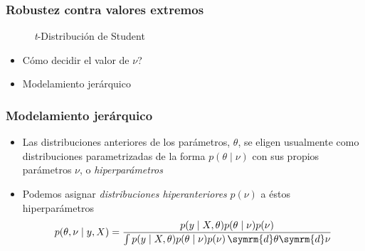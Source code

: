 \documentclass[xcolor=dvipsnames,10pt]{beamer}
\def\basefunc{%
  gamma(.5*(\n+1))/(sqrt(\n*pi)*gamma(.5*\n))*((1+x^2/\n)^(-.5*(\n+1)))%
}
\begin{document}
%
\begin{frame}
  \frametitle{Robustez contra valores extremos}
  \begin{figure}
    \caption{\emph{t}-Distribución de Student}
  \end{figure}
  \begin{itemize}
  \item Cómo decidir el valor de $\nu$?
  \item Modelamiento jerárquico
  \end{itemize}
\end{frame}
%
\begin{frame}
  \frametitle{Modelamiento jerárquico}
  \begin{itemize}
  \item Las distribuciones anteriores de los parámetros, $\theta$, se eligen usualmente como distribuciones parametrizadas de la forma $p(\theta \mid \nu)$ con sus propios parámetros $\nu$, o \emph{hiperparámetros}
  \item Podemos asignar \emph{distribuciones hiperanteriores} $p(\nu)$ a éstos hiperparámetros 
    \begin{equation*}
      p(\theta, \nu \mid y, X) = \frac{p(y \mid X, \theta) p(\theta \mid \nu) p(\nu) }{\int p(y \mid X, \theta) p(\theta \mid \nu) p(\nu) \, \symrm{d} \theta \symrm{d} \nu}
    \end{equation*}
  \end{itemize}
\end{frame}
%
\begin{frame}
  \pythonframe
\end{frame}
\end{document}
